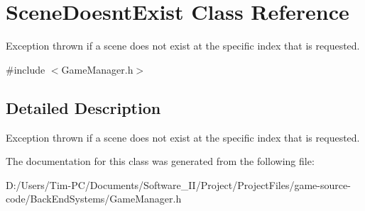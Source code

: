 \hypertarget{class_scene_doesnt_exist}{}\section{Scene\+Doesnt\+Exist Class Reference}
\label{class_scene_doesnt_exist}


Exception thrown if a scene does not exist at the specific index that is requested.  




{\ttfamily \#include $<$Game\+Manager.\+h$>$}



\subsection{Detailed Description}
Exception thrown if a scene does not exist at the specific index that is requested. 

The documentation for this class was generated from the following file\+:\begin{DoxyCompactItemize}
\item 
D\+:/\+Users/\+Tim-\/\+P\+C/\+Documents/\+Software\+\_\+\+I\+I/\+Project/\+Project\+Files/game-\/source-\/code/\+Back\+End\+Systems/Game\+Manager.\+h\end{DoxyCompactItemize}
